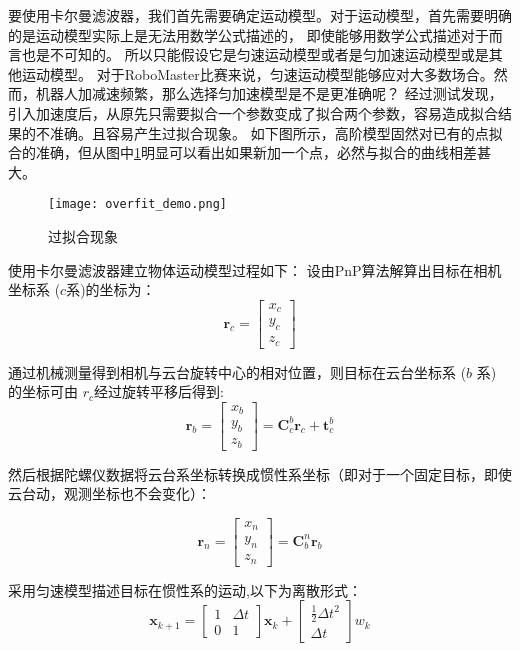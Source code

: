 要使用卡尔曼滤波器，我们首先需要确定运动模型。对于运动模型，首先需要明确的是运动模型实际上是无法用数学公式描述的，
即使能够用数学公式描述对于而言也是不可知的。 所以只能假设它是匀速运动模型或者是匀加速运动模型或是其他运动模型。
对于RoboMaster比赛来说，匀速运动模型能够应对大多数场合。然而，机器人加减速频繁，那么选择匀加速模型是不是更准确呢？ 
经过测试发现，引入加速度后，从原先只需要拟合一个参数变成了拟合两个参数，容易造成拟合结果的不准确。且容易产生过拟合现象。
如下图所示，高阶模型固然对已有的点拟合的准确，但从图中\ref{过拟合现象}明显可以看出如果新加一个点，必然与拟合的曲线相差甚大。
\begin{figure}[H]
    \centering
    \texttt{[image: overfit\_demo.png]} 
    \caption{过拟合现象} 
    \label{过拟合现象} 
\end{figure} 

使用卡尔曼滤波器建立物体运动模型过程如下：
设由PnP算法解算出目标在相机坐标系 ($c$系)的坐标为：
\begin{equation} \boldsymbol r_c=\left[\begin{array}{c} x_c\\ y_c\\ z_c \end{array}\right] \end{equation}
\par 
通过机械测量得到相机与云台旋转中心的相对位置，则目标在云台坐标系 ($b$ 系) 的坐标可由 $r_c$经过旋转平移后得到:
\begin{equation} \boldsymbol r_b=\left[\begin{array}{c} x_b\\ y_b\\ z_b \end{array}\right] =\boldsymbol C_{c}^{b}\boldsymbol r_c + \boldsymbol t_{c}^{b} \end{equation}
\par 
然后根据陀螺仪数据将云台系坐标转换成惯性系坐标（即对于一个固定目标，即使云台动，观测坐标也不会变化）：


\begin{equation} \boldsymbol r_n=\left[\begin{array}{c} x_n\\ y_n\\ z_n \end{array}\right] =\boldsymbol C_{b}^{n}\boldsymbol r_b \end{equation}

\par
采用匀速模型描述目标在惯性系的运动,以下为离散形式：
\begin{equation} \boldsymbol x_{k+1} =\left[\begin{array}{cc} {1} & \Delta t  \\ 0 & {1}  \end{array}\right]\boldsymbol x_{k} + \left[\begin{array}{c} {\frac{1}{2}\Delta t^2} \\ {\Delta t}  \end{array}\right]w_k \end{equation}



